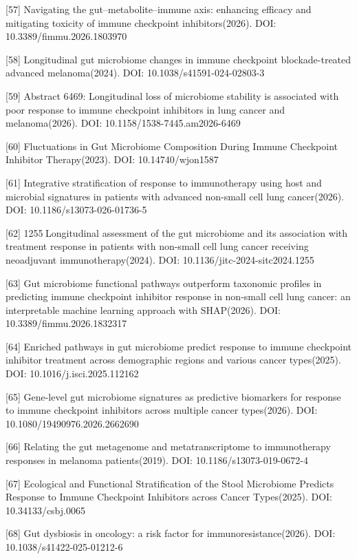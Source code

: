 \documentclass[11pt]{article}
\begin{document}
{[}57{]} Navigating the gut--metabolite--immune axis: enhancing efficacy and mitigating toxicity of immune checkpoint inhibitors(2026). DOI: 10.3389/fimmu.2026.1803970

{[}58{]} Longitudinal gut microbiome changes in immune checkpoint blockade-treated advanced melanoma(2024). DOI: 10.1038/s41591-024-02803-3

{[}59{]} Abstract 6469: Longitudinal loss of microbiome stability is associated with poor response to immune checkpoint inhibitors in lung cancer and melanoma(2026). DOI: 10.1158/1538-7445.am2026-6469

{[}60{]} Fluctuations in Gut Microbiome Composition During Immune Checkpoint Inhibitor Therapy(2023). DOI: 10.14740/wjon1587

{[}61{]} Integrative stratification of response to immunotherapy using host and microbial signatures in patients with advanced non-small cell lung cancer(2026). DOI: 10.1186/s13073-026-01736-5

{[}62{]} 1255 Longitudinal assessment of the gut microbiome and its association with treatment response in patients with non-small cell lung cancer receiving neoadjuvant immunotherapy(2024). DOI: 10.1136/jitc-2024-sitc2024.1255

{[}63{]} Gut microbiome functional pathways outperform taxonomic profiles in predicting immune checkpoint inhibitor response in non-small cell lung cancer: an interpretable machine learning approach with SHAP(2026). DOI: 10.3389/fimmu.2026.1832317

{[}64{]} Enriched pathways in gut microbiome predict response to immune checkpoint inhibitor treatment across demographic regions and various cancer types(2025). DOI: 10.1016/j.isci.2025.112162

{[}65{]} Gene-level gut microbiome signatures as predictive biomarkers for response to immune checkpoint inhibitors across multiple cancer types(2026). DOI: 10.1080/19490976.2026.2662690

{[}66{]} Relating the gut metagenome and metatranscriptome to immunotherapy responses in melanoma patients(2019). DOI: 10.1186/s13073-019-0672-4

{[}67{]} Ecological and Functional Stratification of the Stool Microbiome Predicts Response to Immune Checkpoint Inhibitors across Cancer Types(2025). DOI: 10.34133/csbj.0065

{[}68{]} Gut dysbiosis in oncology: a risk factor for immunoresistance(2026). DOI: 10.1038/s41422-025-01212-6
\end{document}

